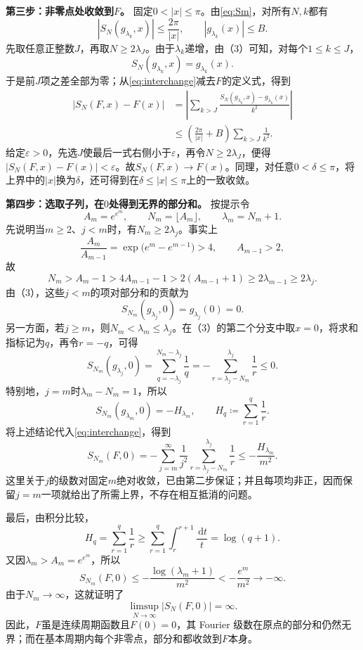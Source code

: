 \documentclass[11pt,a4paper]{ctexart}
\newcommand{\dd}{\,\mathrm d}
\begin{document}
\textbf{第三步：非零点处收敛到$F$。}
固定$0<|x|\le\pi$。由\eqref{eq:Sm}，对所有$N,k$都有
\[
 |S_N(g_{\lambda_k},x)|\le\frac{2\pi}{|x|},
 \qquad |g_{\lambda_k}(x)|\le B.
\]
先取任意正整数$J$，再取$N\ge2\lambda_J$。由于$\lambda_k$递增，由（3）可知，对每个$1\le k\le J$，
\[
 S_N(g_{\lambda_k},x)=g_{\lambda_k}(x).
\]
于是前$J$项之差全部为零；从\eqref{eq:interchange}减去$F$的定义式，得到
\begin{align*}
 |S_N(F,x)-F(x)|
 &=\left|\sum_{k>J}\frac{S_N(g_{\lambda_k},x)-g_{\lambda_k}(x)}{k^2}\right|\\
 &\le\left(\frac{2\pi}{|x|}+B\right)\sum_{k>J}\frac1{k^2}.
\end{align*}
给定$\varepsilon>0$，先选$J$使最后一式右侧小于$\varepsilon$，再令$N\ge2\lambda_J$，便得$|S_N(F,x)-F(x)|<\varepsilon$。故$S_N(F,x)\to F(x)$。同理，对任意$0<\delta\le\pi$，将上界中的$|x|$换为$\delta$，还可得到在$\delta\le|x|\le\pi$上的一致收敛。

\textbf{第四步：选取子列，在$0$处得到无界的部分和。}
按提示令
\[
 A_m=e^{e^m},\qquad N_m=\lfloor A_m\rfloor,\qquad
 \lambda_m=N_m+1.
\]
先说明当$m\ge2$、$j<m$时，有$N_m\ge2\lambda_j$。事实上
\[
 \frac{A_m}{A_{m-1}}=\exp\!\bigl(e^m-e^{m-1}\bigr)>4,
 \qquad A_{m-1}>2,
\]
故
\[
 N_m>A_m-1>4A_{m-1}-1
 >2(A_{m-1}+1)\ge2\lambda_{m-1}\ge2\lambda_j.
\]
由（3），这些$j<m$的项对部分和的贡献为
\[
 S_{N_m}(g_{\lambda_j},0)=g_{\lambda_j}(0)=0.
\]
另一方面，若$j\ge m$，则$N_m<\lambda_m\le\lambda_j$。在（3）的第二个分支中取$x=0$，将求和指标记为$q$，再令$r=-q$，可得
\[
 S_{N_m}(g_{\lambda_j},0)
 =\sum_{q=-\lambda_j}^{N_m-\lambda_j}\frac1q
 =-\sum_{r=\lambda_j-N_m}^{\lambda_j}\frac1r\le0.
\]
特别地，$j=m$时$\lambda_m-N_m=1$，所以
\[
 S_{N_m}(g_{\lambda_m},0)=-H_{\lambda_m},
 \qquad H_q\coloneqq\sum_{r=1}^{q}\frac1r.
\]
将上述结论代入\eqref{eq:interchange}，得到
\[
 S_{N_m}(F,0)
 =-\sum_{j=m}^{\infty}\frac1{j^2}
      \sum_{r=\lambda_j-N_m}^{\lambda_j}\frac1r
 \le-\frac{H_{\lambda_m}}{m^2}.
\]
这里关于$j$的级数对固定$m$绝对收敛，已由第二步保证；并且每项均非正，因而保留$j=m$一项就给出了所需上界，不存在相互抵消的问题。

最后，由积分比较，
\[
 H_q=\sum_{r=1}^{q}\frac1r
 \ge\sum_{r=1}^{q}\int_r^{r+1}\frac{\dd t}{t}
 =\log(q+1).
\]
又因$\lambda_m>A_m=e^{e^m}$，所以
\[
 S_{N_m}(F,0)
 \le-\frac{\log(\lambda_m+1)}{m^2}
 <-\frac{e^m}{m^2}\longrightarrow-\infty.
\]
由于$N_m\to\infty$，这就证明了
\[
 \boxed{\displaystyle\limsup_{N\to\infty}|S_N(F,0)|=\infty.}
\]
因此，$F$虽是连续周期函数且$F(0)=0$，其 Fourier 级数在原点的部分和仍然无界；而在基本周期内每个非零点，部分和都收敛到$F$本身。
\clearpage
\end{document}
